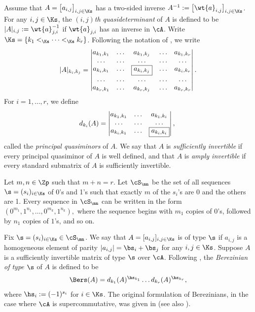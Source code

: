 \documentclass[11pt, reqno]{amsart}
\theoremstyle{definition}
\theoremstyle{remark}
\numberwithin{equation}{section}
\begin{document}
Assume that $A=\big[a_{i,j}\big]_{i,j \in \Ks}$ has a two-sided inverse $A^{-1}:=\big[\wt{a}_{i,j}\big]_{i,j \in \Ks}$.
For any $i, j \in \Ks$, the \emph{$(i,j)$th quasideterminant} of $A$ is defined to be $|A|_{i,j}:=\wt{a}_{j,i}^{-1}$ if $\wt{a}_{j,i}$ has an inverse in $\cA$.
Write $\Ks=\{k_1<_\Ks \cdots <_\Ks k_r\}$.
Following the notation of \cite{GGRW}, we write
$$
|A|_{k_i, k_j}=\begin{vmatrix}
 a_{k_1,k_1} 	& \ldots & a_{k_1,k_j} &\ldots & a_{k_1,k_r} \\
 \ldots	& \ldots & \ldots  &\ldots & \ldots	\\
 a_{k_i,k_1} & \ldots & \fbox{$ a_{k_i,k_j}$} &\ldots & a_{k_i,k_r}\\
 \ldots	& \ldots & \ldots  &\ldots & \ldots	\\
  a_{k_r,k_1}&\ldots & a_{k_r,k_j} &\ldots & a_{k_r,k_r}
\end{vmatrix}.
$$
For $i=1,\ldots,r$, we define
$$
d_{k_i}(A)=\begin{vmatrix}
	 a_{k_1,k_1} 	& \ldots & a_{k_1,k_i}\\
	 \ldots	& \ldots & \ldots \\
	 a_{k_i,k_1} & \ldots & \fbox{$a_{k_i,k_i}$}
\end{vmatrix},\
$$
called the \emph{principal quasiminors} of $A$.
%
We say that $A$ is \emph{sufficiently invertible} if every principal quasiminor of $A$ is well defined, and that $A$ is \emph{amply invertible} if every standard submatrix of $A$ is sufficiently invertible.

Let $m, n \in \Zp$ such that $m+n=r$.
Let $\cS_\mn$ be the set of all sequences $\s=(s_i)_{i \in \Ks}$ of 0's and 1's such that exactly $m$ of the $s_i$'s are 0 and the others are 1.
Every sequence in $\cS_\mn$ can be written in the form
$(0^{m_1}, 1^{n_1}, \ldots, 0^{m_k}, 1^{n_k}),$
where the sequence begins with $m_1$ copies of $0$'s, followed by $n_1$ copies of $1$'s, and so on.

Fix $\s =(s_i)_{i \in \Ks} \in \cS_\mn$. 
We say that $A=[a_{i,j}]_{i,j \in \Ks}$ is of type $\s$ if $a_{i,j}$ is a homogeneous element of parity $|a_{i,j}|=\bs_i+\bs_j$ for any $i,j \in \Ks$.
Suppose $A$ is a sufficiently invertible matrix of type $\s$ over $\cA$.
Following \cite{HM}, the \emph{Berezinian of type $\s$} of $A$ is defined to be
$$
\Bers (A)=d_{k_1} (A)^{\hs_{k_1} }\ldots d_{k_r}(A)^{\hs_{k_r}},
$$
where $\hs_i:=(-1)^{s_i}$ for $i \in \Ks$.
The original formulation of Berezinians, in the case where $\cA$ is supercommutative, was given in \cite{Ber} (see also \cite{MR}).
\end{document}
